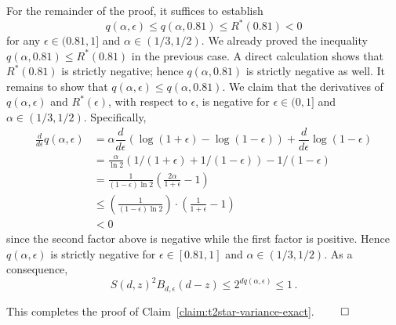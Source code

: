   For the remainder of the proof, it suffices to establish
  \[
      q(\alpha, \epsilon) \leq q(\alpha, 0.81) \leq R^*(0.81) < 0
  \]
  for any $\epsilon \in (0.81, 1]$ and $\alpha \in (1/3, 1/2)$. 
  We already proved the inequality $q(\alpha, 0.81) \leq R^*(0.81)$ in the previous case. 
  A direct calculation shows that $R^*(0.81)$ is strictly negative; 
  hence $q(\alpha, 0.81)$ is strictly negative as well. 
  It remains to show that $q(\alpha, \epsilon) \leq q(\alpha, 0.81)$.
  We claim that the derivatives of $q(\alpha, \epsilon)$ and $R^*(\epsilon)$, 
  with respect to $\epsilon$, is negative for $\epsilon \in (0, 1]$ and $\alpha \in (1/3, 1/2)$. 
  Specifically,
  \begin{align*}
      \frac{d}{d\epsilon} q(\alpha, \epsilon)
      &= \alpha \dfrac{d}{d\epsilon} \left( \log(1+\epsilon) - \log(1-\epsilon)\right) 
          + \dfrac{d}{d\epsilon} \log(1-\epsilon) \\
      &= \frac{\alpha}{\ln 2}\left( 1/(1+\epsilon) + 1/(1-\epsilon)\right)
          - 1/(1-\epsilon) \\
      &= \frac{1}{(1-\epsilon)\ln 2}\left( \frac{2\alpha}{1+\epsilon} - 1\right) \\
      &\leq \left(\frac{1}{(1-\epsilon)\ln 2} \right) \cdot \left( \frac{1}{1+\epsilon} - 1\right) \\
      &< 0
  \end{align*}
  since the second factor above is negative while the first factor is positive.
  Hence $q(\alpha, \epsilon)$ is strictly negative for 
  $\epsilon \in [0.81, 1]$ and $\alpha \in (1/3, 1/2)$. 
  As a consequence,
  \[
      S(d, z)^2 B_{d,\epsilon}(d-z) 
      \leq 2^{d q(\alpha, \epsilon)} 
      \leq 1
      \,.
  \]

  This completes the proof of Claim~\ref{claim:t2star-variance-exact}.
  \hfill$\qed$